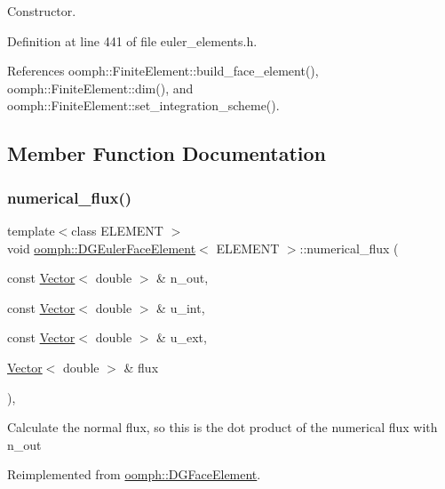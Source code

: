 Constructor. 



Definition at line 441 of file euler\+\_\+elements.\+h.



References oomph\+::\+Finite\+Element\+::build\+\_\+face\+\_\+element(), oomph\+::\+Finite\+Element\+::dim(), and oomph\+::\+Finite\+Element\+::set\+\_\+integration\+\_\+scheme().



\subsection{Member Function Documentation}
\mbox{\label{classoomph_1_1DGEulerFaceElement_a44655910de79b442bfffaefe0152f776}} 
\subsubsection{\texorpdfstring{numerical\+\_\+flux()}{numerical\_flux()}}
{\footnotesize\ttfamily template$<$class E\+L\+E\+M\+E\+NT $>$ \\
void \hyperlink{classoomph_1_1DGEulerFaceElement}{oomph\+::\+D\+G\+Euler\+Face\+Element}$<$ E\+L\+E\+M\+E\+NT $>$\+::numerical\+\_\+flux (\begin{DoxyParamCaption}\item[{const \hyperlink{classoomph_1_1Vector}{Vector}$<$ double $>$ \&}]{n\+\_\+out,  }\item[{const \hyperlink{classoomph_1_1Vector}{Vector}$<$ double $>$ \&}]{u\+\_\+int,  }\item[{const \hyperlink{classoomph_1_1Vector}{Vector}$<$ double $>$ \&}]{u\+\_\+ext,  }\item[{\hyperlink{classoomph_1_1Vector}{Vector}$<$ double $>$ \&}]{flux }\end{DoxyParamCaption})\hspace{0.3cm}{\ttfamily [inline]}, {\ttfamily [virtual]}}

Calculate the normal flux, so this is the dot product of the numerical flux with n\+\_\+out 

Reimplemented from \hyperlink{classoomph_1_1DGFaceElement_a023e05bcee73952fbc2c1f816a0a0860}{oomph\+::\+D\+G\+Face\+Element}.



